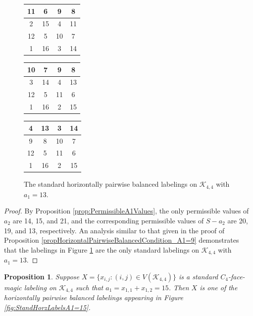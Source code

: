 \documentclass[10pt, reqno]{amsart}
\theoremstyle{definition}
\theoremstyle{plain}
\newtheorem{proposition}[definition]{Proposition}
\begin{document}
\begin{figure}[hbt!]
    \centering
    \begin{tabular}{|c|c|c|c|} \hline
        11 &6   &9   &8   \\  \hline
        2  &15   &4   &11  \\  \hline
        12 &5   &10  &7   \\  \hline
        1  &16  &3   &14  \\  \hline
    \end{tabular}
\hspace{0.15in}\begin{tabular}{|c|c|c|c|} \hline
        10 &7   &9   &8   \\  \hline
        3  &14   &4   &13  \\  \hline
        12 &5   &11  &6   \\  \hline
        1  &16  &2   &15  \\  \hline
    \end{tabular}
 \hspace{0.15in}   \begin{tabular}{|c|c|c|c|} \hline
        4  &13  &3  &14  \\  \hline
        9  &8    &10  &7  \\  \hline
        12 &5   &11  &6  \\  \hline
        1  &16  &2   &15  \\  \hline
    \end{tabular}
    \caption{The standard horizontally pairwise balanced labelings on
    $\mathcal{K}_{4,4}$ with $a_1=13$.}
    \label{fig:StandHorzLabelsA1=13}
\end{figure}

\begin{proof}
    By Proposition \ref{prop:PermissibleA1Values}, the only
    permissible values of $a_2$ are 14, 15, and 21,
    and the corresponding permissible values of $S-a_2$
    are 20, 19, and 13, respectively.
    An analysis similar to that given in the proof of
    Proposition \ref{propHorizontalPairwiseBalancedCondition_A1=9}
    demonstrates that the labelings in Figure \ref{fig:StandHorzLabelsA1=13} are the only standard
    labelings on $\mathcal{K}_{4,4}$ with $a_1=13$.
\end{proof}


\begin{proposition} 
\label{propHorizontalPairwiseBalancedCondition_A1=15}
  Suppose $X=\{ x_{i,j} : (i,j) \in V(\mathcal{K}_{4,4})\}$ 
  is a standard $C_4$-face-magic labeling on $\mathcal{K}_{4,4}$ 
  such that $a_1=x_{1,1}+x_{1,2}=15$.
  Then $X$ is one of the 
  horizontally pairwise balanced labelings appearing in
  Figure \ref{fig:StandHorzLabelsA1=15}. 
\end{proposition}
\end{document}
